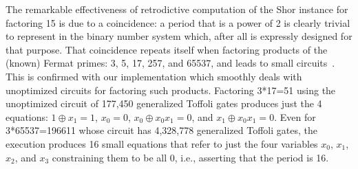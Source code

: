 \documentclass[sigplan,screen]{acmart}
\theoremstyle{definition}
\begin{document}
The remarkable effectiveness of retrodictive computation of the Shor
instance for factoring 15 is due to a coincidence: a period that is a
power of 2 is clearly trivial to represent in the binary number system
which, after all is expressly designed for that purpose. That
coincidence repeats itself when factoring products of the (known)
Fermat primes: 3, 5, 17, 257, and 65537, and leads to small
circuits~\cite{shorFermat}. This is confirmed with our implementation
which smoothly deals with unoptimized circuits for factoring such
products. Factoring 3*17=51 using the unoptimized circuit of 177,450
generalized Toffoli gates produces just the 4 equations: $1 \oplus x_1
= 1$, $x_0 = 0$, $x_0 \oplus x_0x_1 = 0$, and $x_1 \oplus x_0x_1 =
0$. Even for 3*65537=196611 whose circuit has 4,328,778 generalized
Toffoli gates, the execution produces 16 small equations that refer to
just the four variables $x_0$, $x_1$, $x_2$, and $x_3$ constraining
them to be all 0, i.e., asserting that the period is 16.
\end{document}
